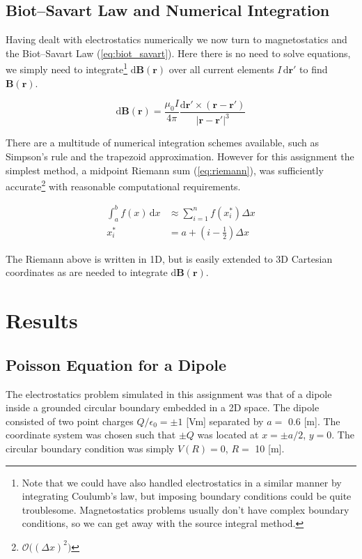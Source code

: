 \documentclass[notitlepage,aps,prd,nofootinbib]{revtex4-1}
\DeclareRobustCommand{\orderof}{\ensuremath{\mathcal{O}}}
\begin{document}
\clearpage
\subsection{Biot--Savart Law and Numerical Integration}
\label{subsec:biot_savart_theory}
Having dealt with electrostatics numerically we now turn to magnetostatics and the Biot--Savart Law (\ref{eq:biot_savart}). Here there is no need to solve equations, we simply need to integrate\footnote{Note that we could have also handled electrostatics in a similar manner by integrating Coulumb's law, but imposing boundary conditions could be quite troublesome. Magnetostatics problems usually don't have complex boundary conditions, so we can get away with the source integral method.} $\mathrm{d}\mathbf{B}\left(\mathbf{r}\right)$ over all current elements $I\,\mathrm{d}\mathbf{r}'$ to find $\mathbf{B}\left(\mathbf{r}\right)$.

\begin{equation} \label{eq:biot_savart}
\mathrm{d}\mathbf{B}\left(\mathbf{r}\right) = \frac{\mu_{0}I}{4\pi} \frac{\mathrm{d}\mathbf{r}' \times \left(\mathbf{r} - \mathbf{r}'\right)}{\left|\mathbf{r} - \mathbf{r}'\right|^{3}}
\end{equation}

There are a multitude of numerical integration schemes available, such as Simpson's rule and the trapezoid approximation. However for this assignment the simplest method, a midpoint Riemann sum (\ref{eq:riemann}), was sufficiently accurate\footnote{$\orderof\big(\left(\Delta x\right)^2\big)$} with reasonable computational requirements.

\begin{align} 
\int_{a}^{b} f\left(x\right)\,\mathrm{d}x &\approx \displaystyle\sum_{i=1}^{n} f\left(x_{i}^{*}\right) \Delta x \label{eq:riemann} \\
x_{i}^{*} &= a + \left(i-\frac{1}{2}\right) \Delta x \label{eq:reimann_midpoint}
\end{align}

The Riemann above is written in 1D, but is easily extended to 3D Cartesian coordinates as are needed to integrate $\mathrm{d}\mathbf{B}\left(\mathbf{r}\right)$. 

\section{Results}
\label{sec:results}

\subsection{Poisson Equation for a Dipole}
\label{subsec:poisson_results}
The electrostatics problem simulated in this assignment was that of a dipole inside a grounded circular boundary embedded in a 2D space. The dipole consisted of two point charges $Q/\epsilon_{0} = \pm1$ [Vm] separated by $a =$ 0.6 [m]. The coordinate system was chosen such that $\pm Q$ was located at $x = \pm a/2$, $y=0$. The circular boundary condition was simply $V\left(R\right) = 0$, $R =$ 10 [m].
\end{document}
